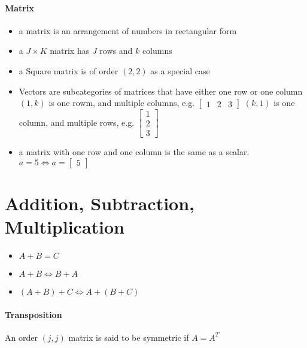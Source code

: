 \documentclass{article}
\theoremstyle{definition}
\theoremstyle{remark}
\begin{document}
\paragraph{Matrix}
\begin{itemize}
    \item a matrix is an arrangement of numbers in rectangular form
    \item a $J \times K$ matrix has $J$ rows and $k$ columns
    \item a Square matrix is of order $(2,2)$ as a special case
    \item Vectors are subcategories of matrices that have either one row or one column
    \subitem $(1,k)$ is one rowm, and multiple columns, e.g. $\begin{bmatrix} 1 & 2 & 3 \end{bmatrix}$
    \subitem $(k,1)$ is one column, and multiple rows, e.g. $\begin{bmatrix} 1 \\ 2 \\ 3 \end{bmatrix}$
    \item a matrix with one row and one column is the same as a scalar. $a = 5 \Leftrightarrow a = \begin{bmatrix}
        5
    \end{bmatrix}$
\end{itemize}

\section{Addition, Subtraction, Multiplication}

\begin{itemize}
    \item $A + B = C$
    \item $A + B \Leftrightarrow B + A$
    \item $(A + B) + C \Leftrightarrow A + (B + C)$
\end{itemize}

\paragraph{Transposition}
An order $(j,j)$ matrix is said to be symmetric if $A = A^T$
\end{document}
